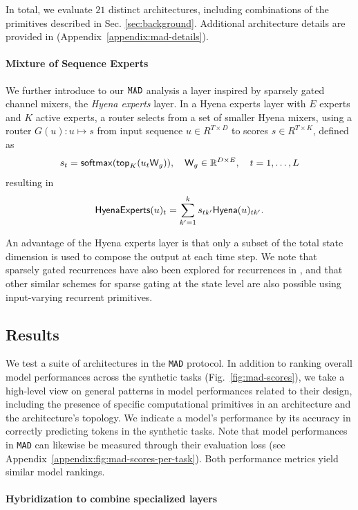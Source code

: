 In total, we evaluate $21$ distinct architectures, including combinations of the primitives described in Sec. \ref{sec:background}. Additional architecture details are provided in (Appendix~\ref{appendix:mad-details}). 

\paragraph{Mixture of Sequence Experts}

We further introduce to our ${\tt MAD}$ analysis a layer inspired by sparsely gated channel mixers, the \textit{Hyena experts} layer. In a Hyena experts layer with $E$ experts and $K$ active experts, a router selects from a set of smaller Hyena mixers, using a router $G(u): u\mapsto s$ from input sequence $u\in R^{T \times D} $ to scores $s \in R^{T \times K}$, defined as
\[
s_t = {\sf softmax}({\sf top}_K(u_t {\sf W}_g)), \quad {\sf W}_g \in \mathbb{R}^{D \times E},\quad t = 1, \dots, L 
\]
resulting in 
\[
{\sf HyenaExperts}(u)_t = \sum_{k'=1}^k s_{tk'} {\sf Hyena}(u)_{tk'}.
\]

An advantage of the Hyena experts layer is that only a subset of the total state dimension is used to compose the output at each time step. We note that sparsely gated recurrences have also been explored for recurrences in \cite{ren2024sparse}, and that other similar schemes for sparse gating at the state level are also possible using input-varying recurrent primitives.

\subsection{Results}

We test a suite of architectures in the {\tt MAD} protocol. In addition to ranking overall model performances across the synthetic tasks (Fig.~\ref{fig:mad-scores}), we take a high-level view on general patterns in model performances related to their design, including the presence of specific computational primitives in an architecture and the architecture's topology. We indicate a model's performance by its accuracy in correctly predicting tokens in the synthetic tasks. Note that model performances in {\tt MAD} can likewise be measured through their evaluation loss (see Appendix~\ref{appendix:fig:mad-scores-per-task}).
Both performance metrics yield similar model rankings.

\paragraph{Hybridization to combine specialized layers} 

